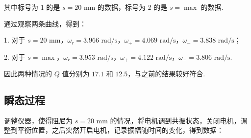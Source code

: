 \documentclass{THUexprep}
\begin{document}
其中标号为 1 的是 $s=20\text{ mm}$ 的数据，标号为 2 的是 $s=\max$ 的数据.

通过观察两条曲线，得到：

1. 对于 $s=20\text{ mm}$，$\omega_r=3.966\text{ rad/s}$，$\omega_+=4.069\text{ rad/s}$，$\omega_-=3.838\text{ rad/s}$；

2. 对于 $s=\max$，$\omega_r=3.953\text{ rad/s}$，$\omega_+=4.122\text{ rad/s}$，$\omega_-=3.806\text{ rad/s}$.

因此两种情况的 $Q$ 值分别为 $17.1$ 和 $12.5$，与之前的结果较好符合.

\subsection{瞬态过程}

调整仪器，使得阻尼为 $s=20\text{ mm}$ 的情况，将电机调到共振状态，关闭电机，调整到平衡位置，之后突然开启电机，记录振幅随时间的变化，得到数据：
\end{document}
